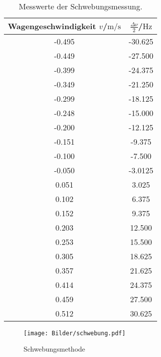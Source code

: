 \begin{table}
	\centering
	\caption{Messwerte der Schwebungsmessung.}
	\label{tab:schwebung}
	\begin{tabular}{cc}
		\toprule
		Wagengeschwindigkeit $v$/$\si{\meter\per\second}$ & $\frac{\Delta \nu}{2}$/$\si{\Hz}$ \\
		\midrule
		-0.495                                            & -30.625                           \\
		-0.449                                            & -27.500                           \\
		-0.399                                            & -24.375                           \\
		-0.349                                            & -21.250                           \\
		-0.299                                            & -18.125                           \\
		-0.248                                            & -15.000                           \\
		-0.200                                            & -12.125                           \\
		-0.151                                            & -9.375                            \\
		-0.100                                            & -7.500                            \\
		-0.050                                            & -3.0125                           \\
		0.051                                             & 3.025                             \\
		0.102                                             & 6.375                             \\
		0.152                                             & 9.375                             \\
		0.203                                             & 12.500                            \\
		0.253                                             & 15.500                            \\
		0.305                                             & 18.625                            \\
		0.357                                             & 21.625                            \\
		0.414                                             & 24.375                            \\
		0.459                                             & 27.500                            \\
		0.512                                             & 30.625                            \\
		\bottomrule
	\end{tabular}
\end{table}

\begin{figure}
	\centering
	\texttt{[image: Bilder/schwebung.pdf]}
	\caption{Schwebungsmethode}
	\label{fig:doppler_schwebung}
\end{figure}
